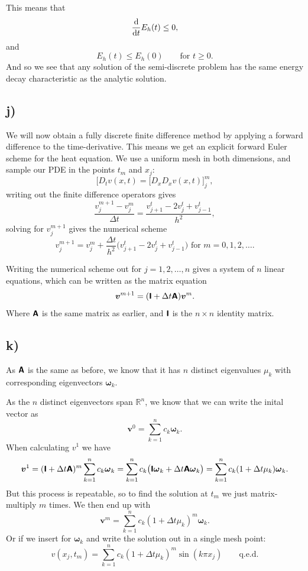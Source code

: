 \documentclass[a4paper, 11pt, notitlepage, english]{article}
\renewcommand{\d}{{\rm d}}
\newcommand{\bt}[1]{\boldsymbol{#1}}
\newcommand{\mat}[1]{\textsf{\textbf{#1}}}
\begin{document}
This means that
$$\frac{\d}{\d t} E_h(t) \leq 0,$$
and
$$E_h(t) \leq E_h(0) \qquad \mbox{for } t \geq 0.$$ 
And so we see that any solution of the semi-discrete problem has the same energy decay characteristic as the analytic solution.

\subsection*{j)}
We will now obtain a fully discrete finite difference method by applying a forward difference to the time-derivative. This means we get an explicit forward Euler scheme for the heat equation. We use a uniform mesh in both dimensions, and sample our PDE in the points $t_m$
and $x_j$:
$$\big[D_t v(x, t) = [D_x D_x v(x, t)\big]^m_j,$$
writing out the finite difference operators gives
$$\frac{v_j^{m+1}-v_j^m}{\Delta t} = \frac{v_{j+1}^t - 2v_j^t + v_{j-1}^t}{h^2},$$
solving for $v_j^{m+1}$ gives the numerical scheme
$$v_j^{m+1} = v_j^m + \frac{\Delta t}{h^2}\big(v_{j+1}^t - 2v_j^t + v_{j-1}^t\big) \mbox{ for } m=0,1,2,\ldots.$$

Writing the numerical scheme out for $j=1,2,\ldots,n$
gives a system of $n$ linear equations, 
which can be written as the matrix equation
 $$\bt{v}^{m+1} = (\mat{I} + \Delta t \mat{A})\bt{v}^m.$$
Where $\mat{A}$ is the same
 matrix as earlier, 
 and $\mat{I}$ is the $n\times n$ identity matrix.

\subsection*{k)}
As $\mat{A}$ is the same as before, we know that it has $n$ distinct eigenvalues $\mu_k$ with corresponding eigenvectors $\bt{\omega}_k$. 

As the $n$ distinct eigenvectors span $\mathbb{R}^n$, we know that we can write the inital vector as
$$\bt{v}^0 = \sum_{k=1}^n c_k \bt{\omega}_k.$$
When calculating $v^1$ we have
$$\bt{v}^1 = (\mat{I} + \Delta t \mat{A})^m \sum_{k=1}^n c_k \bt{\omega}_k = \sum_{k=1}^n c_k \big(\mat{I} \bt{\omega}_k + \Delta t \mat{A}\bt{\omega}_k\big) = \sum_{k=1}^n c_k (1  + \Delta t \mu_k)\bt{\omega}_k.$$
But this process is repeatable, so to find the solution at $t_m$ we just matrix-multiply $m$ times. We then end up with
$$\bt{v}^m = \sum_{k=1}^n c_k (1  + \Delta t \mu_k)^m \bt{\omega}_k.$$
Or if we insert for $\bt{\omega}_k$ and write the solution out in a single mesh point:
$$v(x_j, t_m) = \sum_{k=1}^n c_k (1  + \Delta t \mu_k)^m \sin(k\pi x_j)\qquad \mbox{q.e.d.}$$
\end{document}
